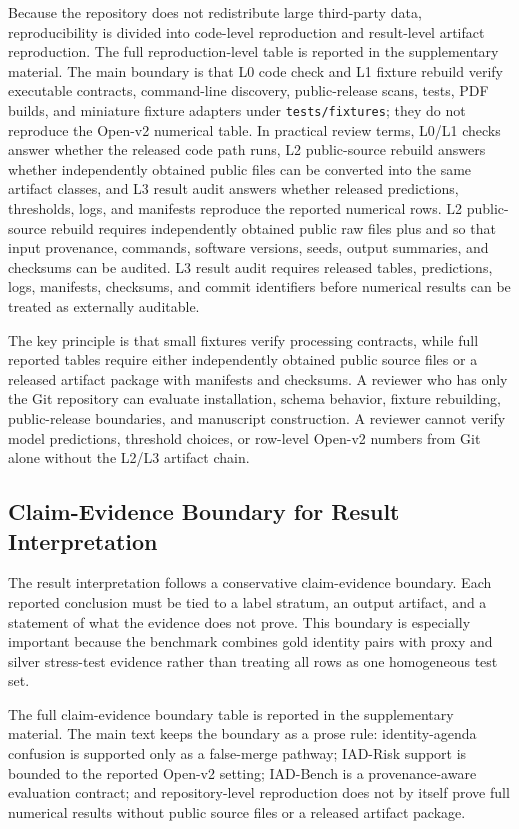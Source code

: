 \documentclass[preprint,12pt]{elsarticle}
\begin{document}
Because the repository does not redistribute large third-party data, reproducibility is divided into code-level reproduction and result-level artifact reproduction. The full reproduction-level table is reported in the supplementary material. The main boundary is that L0 code check and L1 fixture rebuild verify executable contracts, command-line discovery, public-release scans, tests, PDF builds, and miniature fixture adapters under \texttt{tests/fixtures}; they do not reproduce the Open-v2 numerical table. In practical review terms, L0/L1 checks answer whether the released code path runs, L2 public-source rebuild answers whether independently obtained public files can be converted into the same artifact classes, and L3 result audit answers whether released predictions, thresholds, logs, and manifests reproduce the reported numerical rows. L2 public-source rebuild requires independently obtained public raw files plus  and  so that input provenance, commands, software versions, seeds, output summaries, and checksums can be audited. L3 result audit requires released tables, predictions, logs, manifests, checksums, and commit identifiers before numerical results can be treated as externally auditable.

The key principle is that small fixtures verify processing contracts, while full reported tables require either independently obtained public source files or a released artifact package with manifests and checksums. A reviewer who has only the Git repository can evaluate installation, schema behavior, fixture rebuilding, public-release boundaries, and manuscript construction. A reviewer cannot verify model predictions, threshold choices, or row-level Open-v2 numbers from Git alone without the L2/L3 artifact chain.

\subsection{Claim-Evidence Boundary for Result Interpretation}

The result interpretation follows a conservative claim-evidence boundary. Each reported conclusion must be tied to a label stratum, an output artifact, and a statement of what the evidence does not prove. This boundary is especially important because the benchmark combines gold identity pairs with proxy and silver stress-test evidence rather than treating all rows as one homogeneous test set.

The full claim-evidence boundary table is reported in the supplementary material. The main text keeps the boundary as a prose rule: identity-agenda confusion is supported only as a false-merge pathway; IAD-Risk support is bounded to the reported Open-v2 setting; IAD-Bench is a provenance-aware evaluation contract; and repository-level reproduction does not by itself prove full numerical results without public source files or a released artifact package.
\end{document}
